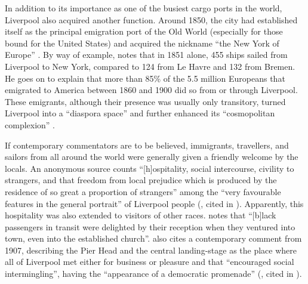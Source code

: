In addition to its importance as one of the busiest cargo ports in the world, Liverpool also acquired another function.
Around 1850, the city had established itself as the principal emigration port of the Old World (especially for those bound for the United States) and acquired the nickname ``the New York of Europe'' \parencite[xxvii]{belchem2006c}.
By way of example, \citet[14]{belchem2006a} notes that in 1851 alone, 455 ships sailed from Liverpool to New York, compared to 124 from Le Havre and 132 from Bremen.
He goes on to explain that more than 85\% of the 5.5 million Europeans that emigrated to America between 1860 and 1900 did so from or through Liverpool.
These emigrants, although their presence was usually only transitory, turned Liverpool into a ``diaspora space'' and further enhanced its ``cosmopolitan complexion'' \parencite[14]{belchem2006a}.

If contemporary commentators are to be believed, immigrants, travellers, and sailors from all around the world were generally given a friendly welcome by the locals.
An anonymous source counts ``[h]ospitality, social intercourse, civility to strangers, and that freedom from local prejudice which is produced by the residence of so great a proportion of strangers'' among the ``very favourable features in the general portrait'' of Liverpool people (\citealt{anon1812}, cited in \citealt[12]{crowley2012}).
Apparently, this hospitality was also extended to visitors of other races.
\citet[13]{belchem2006a} notes that ``[b]lack passengers in transit were delighted by their reception when they ventured into town, even into the established church''.
\textcite{belchem2006d} also cites a contemporary comment from 1907, describing the Pier Head and the central landing-stage as the place where all of Liverpool met either for business or pleasure and that ``encouraged social intermingling'', having the ``appearance of a democratic promenade'' (\citealt{scott1907}, cited in \citealt[45]{belchem2006d}).

